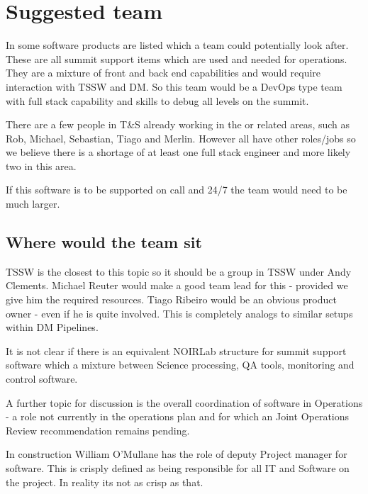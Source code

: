 \section{Suggested team} \label{sec:team}

In  some \gls{software} products are listed which a team could potentially look after.
These are all summit support items which are used and needed for operations.
They are a mixture of front and back end capabilities and would require interaction with TSSW and \gls{DM}.
So this team would be a DevOps type team with full \gls{stack} capability and skills to debug all levels on the summit.

There are a few people in T\&S already working in the or related areas, such as Rob, Michael, Sebastian, Tiago and Merlin.
However all have other roles/jobs so we believe there is a shortage of at least one full \gls{stack} engineer and more likely two in this area.


If this \gls{software} is to be supported on call and 24/7 the team would need to be much larger.


\subsection{Where would the team sit}
TSSW is the closest to this topic so it should be a group in TSSW under Andy Clements.
Michael Reuter would make a good team lead for this - provided we give him the required resources.
Tiago Ribeiro would be an obvious product owner - even if he is quite involved.
This is completely analogs to similar setups within DM Pipelines.

It is not clear if there is an equivalent \gls{NOIRLab} structure for summit support \gls{software} which
a mixture between Science processing, \gls{QA} tools, \gls{monitoring} and control software.

A further topic for discussion is the overall coordination of software in \VRO  \gls{Operations} - a role not currently in the operations plan and for which an Joint \gls{Operations} \gls{Review} recommendation remains pending.

In construction William O'Mullane has the role of deputy Project manager for software.  This is crisply defined as being responsible for all IT and Software on the project.
In reality its not as crisp as that.


